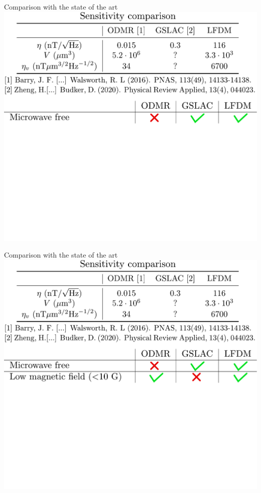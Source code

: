 \documentclass{beamer}
\begin{document}
\begin{frame}{Comparison with the state of the art}
\centering
\includegraphics[width=\textwidth,height=0.85\textheight,keepaspectratio]{Slide_comparison_litterature_f-4}
\end{frame}

\begin{frame}{Comparison with the state of the art}
\centering
\includegraphics[width=\textwidth,height=0.85\textheight,keepaspectratio]{Slide_comparison_litterature_f-3}
\end{frame}
\end{document}
